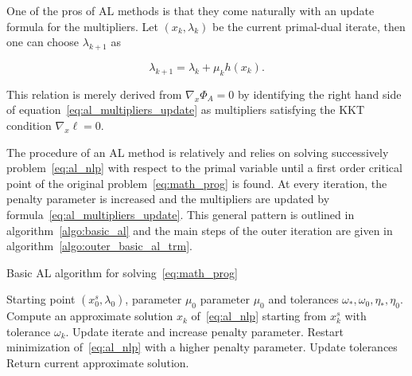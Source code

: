 \documentclass[10pt]{article}
\numberwithin{equation}{section}
\begin{document}
	 One of the pros of AL methods is that they come naturally with an update formula for the multipliers. Let \((x_k,\lambda_k)\) be the current primal-dual iterate, then one can choose \(\lambda_{k+1} \) as
	 
	 \begin{equation}\label{eq:al_multipliers_update}
	 	\lambda_{k+1} = \lambda_k + \mu_kh(x_k).
	 \end{equation}
	 
	 This relation is merely derived from \(\nabla_x\Phi_A=0\) by identifying the right hand side of equation~\eqref{eq:al_multipliers_update} as multipliers satisfying the KKT condition \(\nabla_x \ell =0\).
	 
	 The procedure of an AL method is relatively  and relies on solving successively  problem~\eqref{eq:al_nlp} with respect to the primal variable until a first order critical point of the original problem~\eqref{eq:math_prog} is found. At every iteration, the penalty parameter is increased and the multipliers are updated by formula~\eqref{eq:al_multipliers_update}. This general pattern is outlined in algorithm~\ref{algo:basic_al} and the main steps of the outer iteration are given in  algorithm~\ref{algo:outer_basic_al_trm}.
	 
	 	\begin{algorithm}
	 		\caption{Basic AL algorithm for solving~\eqref{eq:math_prog}}\label{algo:basic_al}
	 		\begin{algorithmic}
	 			\Require Starting point $\left(x_0^s,\lambda_0\right)$, parameter $\mu_0$  parameter $\mu_0$ and tolerances $\omega_*,\omega_0,\eta_*,\eta_0$.
	 			\Repeat
	 			 \State Compute an approximate solution $x_{k}$ of~\eqref{eq:al_nlp} starting from \(x_k^s\) with tolerance $\omega_k$.
	 				\State Update iterate and increase penalty parameter.
	 				\Else
	 					\State Restart minimization of~\eqref{eq:al_nlp} with a higher penalty parameter.
	 			\EndIf
	 			\State Update tolerances
	 			\State Return current approximate solution.
	 		\end{algorithmic}
	 	\end{algorithm}
	 	
\end{document}
